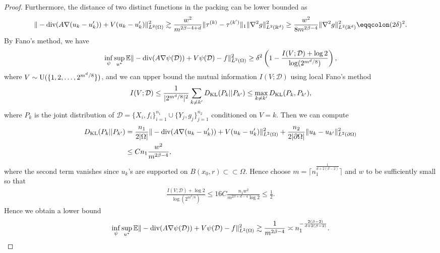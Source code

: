 \documentclass{article}
\newcommand{\R}{\mathbb{R}}
\newcommand{\E}{\mathbb{E}}
\newcommand{\KL}{\textnormal{KL}}
\newcommand{\D}{\mathcal{D}}
\renewcommand{\div}{\textnormal{div}}
\theoremstyle{plain}
\theoremstyle{definition}
\theoremstyle{remark}
\begin{document}
\begin{proof}
    Furthermore, the distance of two distinct functions in the packing can be lower bounded as 
    \begin{align*}
           \|-\div (A \nabla (u_k -u_k')) + V(u_k - u_k') \|_{L^2(\Omega)}^2  \gtrsim \frac{w^2}{m^{2\beta - 4 + d}} \|\tau^{(k)} - \tau^{(k')}\|_1 \|\nabla^2 g\|_{L^2(\R^d)}^2 \geq \frac{w^2}{8 m^{2\beta - 4}} \|\nabla^2 g\|_{L^2(\R^d)}^2 \eqqcolon (2 \delta)^2 . 
    \end{align*}
    By Fano's method, we have
    \begin{align*}
     \inf_\psi \sup_{u^*} \E \|-\div(A \nabla \psi(\D)) + V \psi(\D) - f\|_{L^2(\Omega)}^2 
         \geq \delta^2 \left(1 - \frac{I(V; \D) + \log{2}}{\log(2^{m^d/8})}\right),
    \end{align*}
    where $V \sim \textnormal{U}(\{1, 2, \ldots, 2^{m^d/8}\})$, and we can upper bound the mutual information $I(V;\D)$ using local Fano's method 
    \begin{equation*}
        I(V; \D) \leq \frac{1}{|2^{m^d/8}|^2} \sum_{k \neq k'} D_{\KL}(P_k || P_{k'}) \leq \max_{k \neq k'} D_{\KL} (P_k, P_{k'}),
    \end{equation*}
     where $P_k$ is the joint distribution of $\D = \{X_i, f_i\}_{i=1}^{n_1} \cup \{Y_j, g_j\}_{j=1}^{n_2}$ conditioned on $V = k$. Then we can compute
    \begin{align*}
        D_{\KL} (P_k || P_{k'}) & = \frac{n_1}{2 |\Omega|} \|-\div (A \nabla (u_k -u_k')) + V(u_k - u_k') \|_{L^2(\Omega)}^2  + \frac{n_2}{2 |\partial \Omega|} \|u_k - u_{k'}\|_{L^2(\partial \Omega)}^2 \\
        & \leq C n_1\frac{w^2}{m^{2\beta - 4}},
    \end{align*}
    where the second term vanishes since $u_k$'s are supported on $B(x_0, r) \subset \subset \Omega$. 
    Hence choose $m = \lceil n_1^{\frac{1}{d+ 2(\beta-2)}} \rceil$ and $w$ to be sufficiently small so that
    \begin{align*}
        \frac{I(V; \D) + \log{2}}{\log(2^{m^d/8})} \leq 16 C\frac{n_1 w^2}{m^{2\beta + d-4} \log{2}}\leq \frac{1}{2}. 
    \end{align*}
    Hence we obtain a lower bound
    \begin{equation*}
         \inf_\psi \sup_{u^*} \E \|-\div(A \nabla \psi(\D)) + V \psi(\D) - f\|_{L^2(\Omega)}^2 \gtrsim \frac{1}{m^{2\beta - 4}} \asymp n_1^{-\frac{2(\beta-2)}{d+2(\beta-2)}}.
    \end{equation*}
\end{proof}
\end{document}
